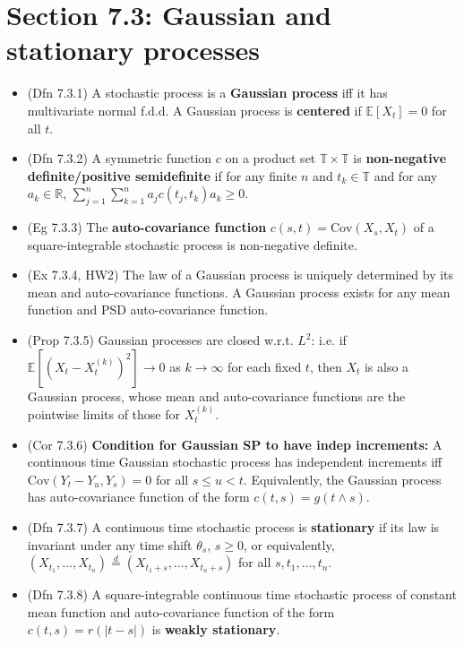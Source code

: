 \documentclass[twoside]{article}
\newcommand{\dis}{\displaystyle}
\newcommand\bbE{\mathbb{E}}
\newcommand\bbR{\mathbb{R}}
\newcommand\bbT{\mathbb{T}}
\def\t{\theta}
\newcommand\goesto{\rightarrow}
\begin{document}
\section*{Section 7.3: Gaussian and stationary processes}
\begin{itemize}
\item (Dfn 7.3.1) A stochastic process is a \textbf{Gaussian process} iff it has multivariate normal f.d.d. A Gaussian process is \textbf{centered} if $\bbE [X_t] = 0$ for all $t$.

\item (Dfn 7.3.2) A symmetric function $c$ on a product set $\bbT \times \bbT$ is \textbf{non-negative definite/positive semidefinite} if for any finite $n$ and $t_k \in \bbT$ and for any $a_k \in \bbR$, $\dis\sum_{j=1}^n\sum_{k=1}^n a_j c(t_j, t_k) a_k \geq 0$.

\item (Eg 7.3.3) The \textbf{auto-covariance function} $c(s,t) = \text{Cov}(X_s, X_t)$ of a square-integrable stochastic process is non-negative definite.

\item (Ex 7.3.4, HW2) The law of a Gaussian process is uniquely determined by its mean and auto-covariance functions. A Gaussian process exists for any mean function and PSD auto-covariance function.

\item (Prop 7.3.5) Gaussian processes are closed w.r.t. $L^2$: i.e. if $\bbE [(X_t - X_t^{(k)})^2] \goesto 0$ as $k \goesto \infty$ for each fixed $t$, then $X_t$ is also a Gaussian process, whose mean and auto-covariance functions are the pointwise limits of those for $X_t^{(k)}$.

\item (Cor 7.3.6) \textbf{Condition for Gaussian SP to have indep increments:} A continuous time Gaussian stochastic process has independent increments iff $\text{Cov}(Y_t - Y_u, Y_s) = 0$ for all $s \leq u < t$. Equivalently, the Gaussian process has auto-covariance function of the form $c(t, s) = g(t \wedge s)$.

\item (Dfn 7.3.7) A continuous time stochastic process is \textbf{stationary} if its law is invariant under any time shift $\t_s$, $s \geq 0$, or equivalently, $(X_{t_1}, \dots, X_{t_n}) \stackrel{d}{=} (X_{t_1 + s}, \dots, X_{t_n + s})$ for all $s, t_1, \dots, t_n$.

\item (Dfn 7.3.8) A square-integrable continuous time stochastic process of constant mean function and auto-covariance function of the form $c(t,s) = r(|t-s|)$ is \textbf{weakly stationary}.


\end{itemize}
\end{document}
